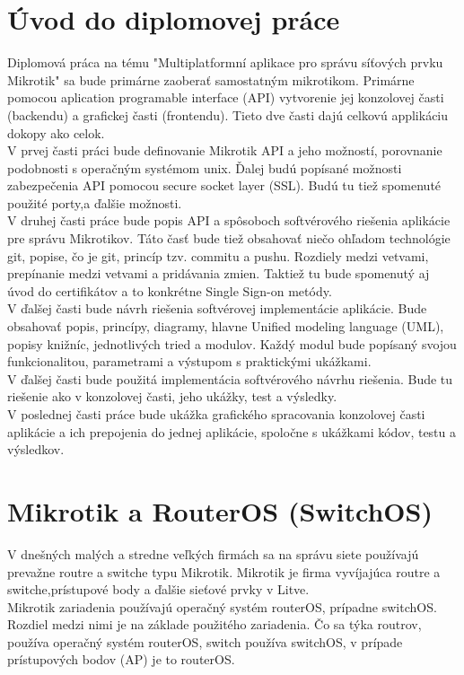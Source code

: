 \chapter{Úvod do diplomovej práce}
Diplomová práca na tému "Multiplatformní aplikace pro správu síťových prvku Mikrotik" sa bude primárne zaoberať samostatným mikrotikom. Primárne pomocou aplication programable interface (API) vytvorenie jej konzolovej časti (backendu) a grafickej časti (frontendu). Tieto dve časti dajú celkovú applikáciu dokopy ako celok.\\
V prvej časti práci bude definovanie Mikrotik API a jeho možností, porovnanie podobnosti s operačným systémom unix. Ďalej budú popísané možnosti zabezpečenia API pomocou secure socket layer (SSL). Budú tu tiež spomenuté použité porty,a ďalšie možnosti.\\
V druhej časti práce bude popis API a spôsoboch softvérového riešenia aplikácie pre správu Mikrotikov. Táto časť bude tiež obsahovať niečo ohľadom technológie git, popise, čo je git, princíp tzv. commitu a pushu. Rozdiely medzi vetvami, prepínanie medzi vetvami a pridávania zmien. Taktiež tu bude spomenutý aj úvod do certifikátov a to konkrétne Single Sign-on metódy.\\
V ďalšej časti bude návrh riešenia softvérovej implementácie aplikácie. Bude obsahovať popis, princípy, diagramy, hlavne Unified modeling language (UML), popisy knižníc, jednotlivých tried a modulov. Každý modul bude popísaný svojou funkcionalitou, parametrami a výstupom s praktickými ukážkami.\\
V ďalšej časti bude použitá implementácia softvérového návrhu riešenia. Bude tu riešenie ako v konzolovej časti, jeho ukážky, test a výsledky. \\
V poslednej časti práce bude ukážka grafického spracovania konzolovej časti aplikácie a ich prepojenia do jednej aplikácie, spoločne s ukážkami kódov, testu  a výsledkov.
\chapter{Mikrotik a RouterOS (SwitchOS)}
V dnešných malých  a stredne veľkých firmách sa na správu siete používajú prevažne routre a switche typu Mikrotik. Mikrotik je firma vyvíjajúca routre a switche,prístupové body a ďalšie sieťové prvky v Litve. \\
Mikrotik zariadenia používajú operačný systém routerOS, prípadne switchOS. Rozdiel medzi nimi je na základe použitého zariadenia. Čo sa týka routrov, používa operačný systém routerOS, switch používa switchOS, v prípade prístupových bodov (AP) je to routerOS. 
